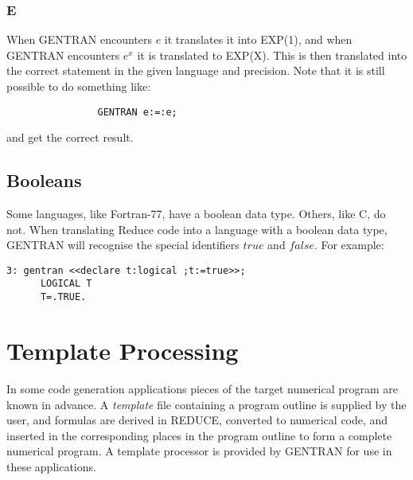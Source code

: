 \subsubsection{E}
 
When GENTRAN encounters $e$ it translates it into EXP(1), and when GENTRAN
encounters
$e^x$ it is translated to EXP(X).  This is then translated
into the correct statement in the given language and precision.  Note that
it is still possible to do something like:
\begin{verbatim}
                GENTRAN e:=:e;
\end{verbatim}
and get the correct result.

\subsection{Booleans}
  
Some languages, like Fortran-77, have a boolean data type.  Others, like
C, do not.  When translating Reduce code into a language with a boolean
data type, GENTRAN will recognise the special identifiers $true$ and
$false$.  For example:
\begin{verbatim}
3: gentran <<declare t:logical ;t:=true>>;
      LOGICAL T
      T=.TRUE.
\end{verbatim}


\section{Template Processing}\label{GENTRAN:template}

  
In some code generation applications pieces of the target numerical
program are known in advance.  A {\it template} file containing a
program outline is supplied by the user, and formulas are derived in
REDUCE, converted to numerical code, and inserted in the corresponding
places in the program outline to form a complete numerical program.  A
template processor is provided by GENTRAN for use in these
applications.

